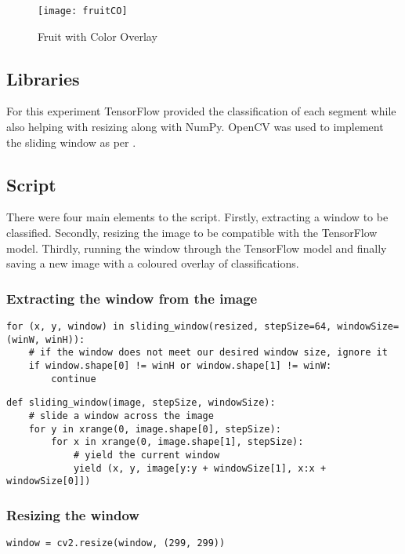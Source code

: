 \begin{figure}
    \texttt{[image: fruitCO]}
    \caption{Fruit with Color Overlay}
    \label{fig:fruitOverlay}
\end{figure}

\subsection*{Libraries}
For this experiment TensorFlow provided the classification of each segment while
also helping with resizing along with NumPy. OpenCV was used to implement the
sliding window as per \parencite{slidingWindowTut}.

\subsection*{Script}
There were four main elements to the script. Firstly, extracting a window to be
classified. Secondly, resizing the image to be compatible with the TensorFlow model. Thirdly, running the window through the TensorFlow model and finally
saving a new image with a coloured overlay of classifications.

\subsubsection*{Extracting the window from the image}
\begin{lstlisting}[style=Python]
for (x, y, window) in sliding_window(resized, stepSize=64, windowSize=(winW, winH)):
	# if the window does not meet our desired window size, ignore it
	if window.shape[0] != winH or window.shape[1] != winW:
		continue
\end{lstlisting}


\begin{lstlisting}[style=Python]
def sliding_window(image, stepSize, windowSize):
	# slide a window across the image
	for y in xrange(0, image.shape[0], stepSize):
		for x in xrange(0, image.shape[1], stepSize):
			# yield the current window
			yield (x, y, image[y:y + windowSize[1], x:x + windowSize[0]])
\end{lstlisting}

\subsubsection*{Resizing the window}
\begin{lstlisting}[style=Python]
window = cv2.resize(window, (299, 299))
\end{lstlisting}

